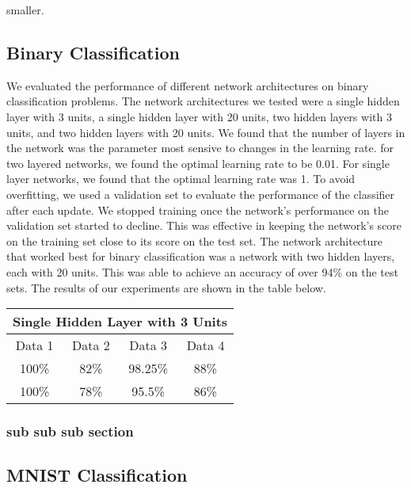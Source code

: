 \documentclass[10pt,twoside]{article}
\begin{document}
\noindent smaller.

\subsection{Binary Classification}

We evaluated the performance of different network architectures on binary classification problems. The network architectures we tested were a single hidden layer with 3 units, a single hidden layer with 20 units, two hidden layers with 3 units, and two hidden layers with 20 units. We found that the number of layers in the network was the parameter most sensive to changes in the learning rate. for two layered networks, we found the optimal learning rate to be 0.01. For single layer networks, 
we found that the optimal learning rate was 1. To avoid overfitting, we used a validation set to evaluate the performance of the classifier after each update. We stopped training once the network's performance on the validation set started to decline. This was effective in keeping the network's score on the training set close to its score on the test set. The network architecture that worked best for binary classification was a network with two hidden layers, each with 20 units. This was able to achieve an accuracy of over 94\% on the test sets. The results of our experiments are shown in the table below. 

\begin{center}
 \begin{tabular}{||c c c c||} 
 \hline
 \multicolumn{4}{|c|}{Single Hidden Layer with 3 Units} \\
 \hline
 \hline
 Data 1 & Data 2 & Data 3 & Data 4 \\ [0.5ex] 
  \hline
 100\% & 82\% & 98.25\% & 88\% \\
 \hline\hline
 100\% & 78\% & 95.5\% & 86\% \\ 

 \hline
\end{tabular}
\end{center}

\subsubsection{sub sub sub section}


\subsection{MNIST Classification}
\end{document}
